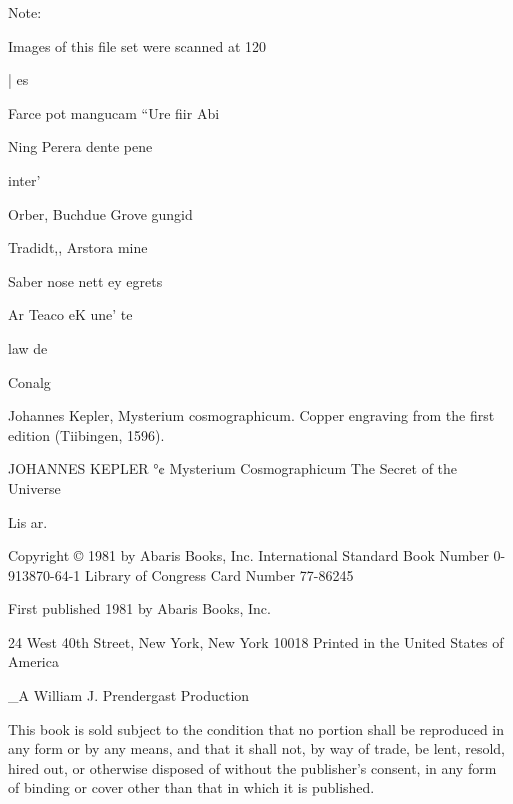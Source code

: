 \documentclass{article}
\begin{document}
Note:

Images of this file set were scanned
at 120%



| es

Farce pot mangucam “Ure fiir Abi

Ning Perera dente pene

inter’

Orber, Buchdue Grove gungid

Tradidt,, Arstora mine

Saber nose nett ey
egrets

Ar Teaco eK une’
te

law de

Conalg

Johannes Kepler, Mysterium cosmographicum. Copper engraving
from the first edition (Tiibingen, 1596).


JOHANNES KEPLER °¢ Mysterium Cosmographicum
The Secret of the Universe


Lis
ar.

Copyright © 1981 by Abaris Books, Inc.
International Standard Book Number 0-913870-64-1
Library of Congress Card Number 77-86245

First published 1981 by Abaris Books, Inc.

24 West 40th Street, New York, New York 10018
Printed in the United States of America

_A William J. Prendergast Production

This book is sold subject to the condition that no portion
shall be reproduced in any form or by any means, and that
it shall not, by way of trade, be lent, resold, hired out, or
otherwise disposed of without the publisher’s consent, in
any form of binding or cover other than that in which it is
published.
\end{document}
